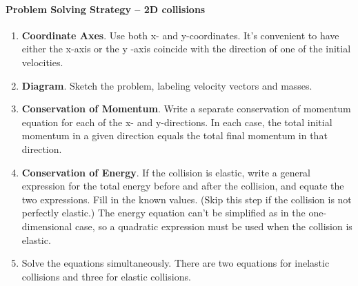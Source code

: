 \paragraph*{Problem Solving Strategy -- 2D collisions}
\begin{enumerate}
\item \textbf{Coordinate Axes}. Use both x- and y-coordinates. It's convenient to have either the x-axis or the y -axis coincide with the direction of one of the initial velocities.
\item \textbf{Diagram}. Sketch the problem, labeling velocity vectors and masses.
\item \textbf{Conservation of Momentum}. Write a separate conservation of momentum equation for each of the x- and y-directions. In each case, the total initial momentum in a given direction equals the total final momentum in that direction.
\item \textbf{Conservation of Energy}. If the collision is elastic, write a general expression for the total energy before and after the collision, and equate the two expressions. Fill in the known values. (Skip this step if the collision is not perfectly elastic.) The energy equation can't be simplified as in the one-dimensional case, so a quadratic expression must be used when the collision is elastic.
\item {Solve the equations simultaneously.} There are two equations for inelastic collisions
and three for elastic collisions.
\end{enumerate}

